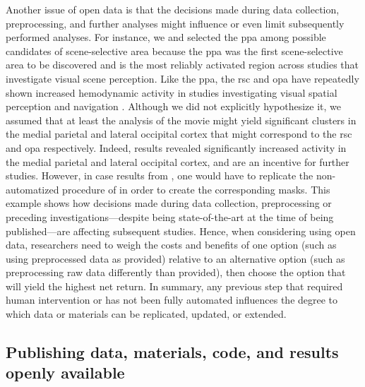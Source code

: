 Another issue of open data is that the decisions made during data collection,
preprocessing, and further analyses might influence or even limit subsequently
performed analyses.
%
For instance, we and \citet{sengupta2016extension} selected the \ac{ppa} among
possible candidates of scene-selective area because the \ac{ppa} was the first
scene-selective area to be discovered and is the most reliably activated region
across studies that investigate visual scene perception.
%
Like the \ac{ppa}, the \ac{rsc} and \ac{opa} have repeatedly shown increased
hemodynamic activity in studies investigating visual spatial perception and
navigation \citep{chrastil2018heterogeneity, bettencourt2013role,
dilks2013occipital, epstein2019scene}.
%
Although we did not explicitly hypothesize it, we assumed that at least the
analysis of the movie might yield significant clusters in the medial parietal
and lateral occipital cortex that might correspond to the \ac{rsc} and \ac{opa}
respectively.
%
Indeed, results revealed significantly increased activity in the medial parietal
and lateral occipital cortex, and are an incentive for further studies.
However, in case results from \citep{sengupta2016extension}, one would have to
replicate the non-automatized procedure of \citep{sengupta2016extension} in
order to create the corresponding masks.
%
This example shows how decisions made during data collection, preprocessing or
preceding investigations---despite being state-of-the-art at the time of being
published---are affecting subsequent studies.
Hence, when considering using open data, researchers need to weigh the costs and
benefits of one option (such as using preprocessed data as provided) relative to
an alternative option (such as preprocessing raw data differently than
provided), then choose the option that will yield the highest net return.
%
In summary, any previous step that required human intervention or has not been
fully automated influences the degree to which data or materials can be
replicated, updated, or extended.




\subsection{Publishing data, materials, code, and results openly available}


